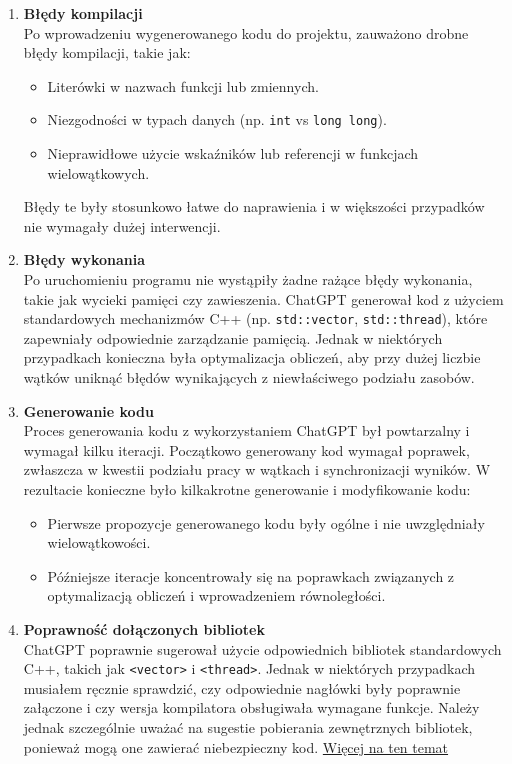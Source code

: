 \begin{enumerate}
  \item \textbf{Błędy kompilacji} \\
        Po wprowadzeniu wygenerowanego kodu do projektu, zauważono drobne błędy kompilacji, takie jak:
        \begin{itemize}
          \item Literówki w nazwach funkcji lub zmiennych.
          \item Niezgodności w typach danych (np. \texttt{int} vs \texttt{long long}).
          \item Nieprawidłowe użycie wskaźników lub referencji w funkcjach wielowątkowych.
        \end{itemize}
        Błędy te były stosunkowo łatwe do naprawienia i w większości przypadków nie wymagały dużej interwencji.

  \item \textbf{Błędy wykonania} \\
        Po uruchomieniu programu nie wystąpiły żadne rażące błędy wykonania, takie jak wycieki pamięci czy zawieszenia. ChatGPT generował kod z użyciem standardowych mechanizmów C++ (np. \texttt{std::vector}, \texttt{std::thread}), które zapewniały odpowiednie zarządzanie pamięcią. Jednak w niektórych przypadkach konieczna była optymalizacja obliczeń, aby przy dużej liczbie wątków uniknąć błędów wynikających z niewłaściwego podziału zasobów.

  \item \textbf{Generowanie kodu} \\
        Proces generowania kodu z wykorzystaniem ChatGPT był powtarzalny i wymagał kilku iteracji. Początkowo generowany kod wymagał poprawek, zwłaszcza w kwestii podziału pracy w wątkach i synchronizacji wyników. W rezultacie konieczne było kilkakrotne generowanie i modyfikowanie kodu:
        \begin{itemize}
          \item Pierwsze propozycje generowanego kodu były ogólne i nie uwzględniały wielowątkowości.
          \item Późniejsze iteracje koncentrowały się na poprawkach związanych z optymalizacją obliczeń i wprowadzeniem równoległości.
        \end{itemize}

  \item \textbf{Poprawność dołączonych bibliotek} \\
        ChatGPT poprawnie sugerował użycie odpowiednich bibliotek standardowych C++, takich jak \texttt{<vector>} i \texttt{<thread>}. Jednak w niektórych przypadkach musiałem ręcznie sprawdzić, czy odpowiednie nagłówki były poprawnie załączone i czy wersja kompilatora obsługiwała wymagane funkcje.
        Należy jednak szczególnie uważać na sugestie pobierania zewnętrznych bibliotek, ponieważ mogą one zawierać niebezpieczny kod. \href{https://www.darkreading.com/application-security/chatgpt-hallucinations-developers-supply-chain-malware-attacks}{Więcej na ten temat \cite{LLMSupplyChainAttacks}}


\end{enumerate}
